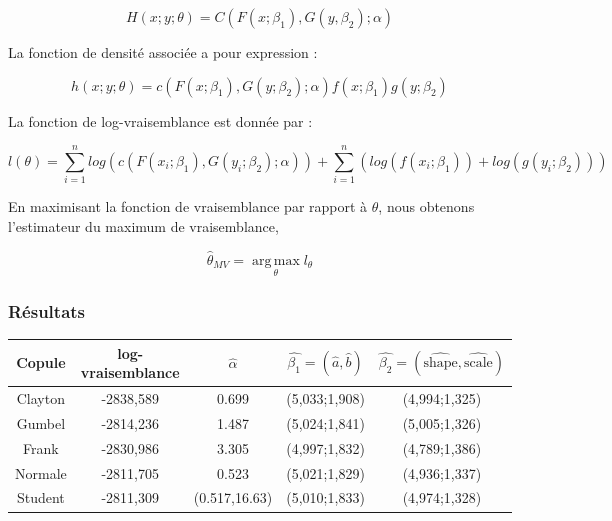 \begin{equation*}
H(x;y;\theta) = C(F(x;\beta_1),G(y,\beta_2);\alpha)
\end{equation*}

\begin{flushleft}
La fonction de densité associée a pour expression :
\end{flushleft}
\begin{equation*}
h(x;y;\theta) = c(F(x;\beta_1),G(y;\beta_2);\alpha)f(x;\beta_1)g(y;\beta_2)
\end{equation*}

\begin{flushleft}
La fonction de log-vraisemblance est donnée par :
\end{flushleft}
\begin{equation*}
l(\theta) = \sum_{i=1}^n log(c(F(x_i;\beta_1),G(y_i;\beta_2);\alpha)) + \sum_{i=1}^n (log(f(x_i;\beta_1)) + log(g(y_i;\beta_2)))
\end{equation*}

En maximisant la fonction de vraisemblance par rapport à $\theta$, nous obtenons l'estimateur du maximum de vraisemblance,

\begin{equation*}
\hat{\theta}_{MV} = \underset{\theta}{\operatorname{arg\,max}}  l_{\theta}
\end{equation*} 

\subsubsection{Résultats}

\begin{center}
\begin{tabular}{|c|c|c|c|c|}
\hline 
Copule & log-vraisemblance & $\hat{\alpha}$ & $\hat{\beta_1} = (\widehat{a},\widehat{b})$ & $\hat{\beta_2} = (\widehat{\text{shape}},\widehat{\text{scale}})$ \\
\hline
Clayton & -2838,589 & 0.699 & (5,033;1,908) & (4,994;1,325) \\
\hline
Gumbel & -2814,236 & 1.487 & (5,024;1,841) & (5,005;1,326) \\
\hline
Frank & -2830,986 & 3.305 & (4,997;1,832) & (4,789;1,386) \\
\hline
Normale & -2811,705 & 0.523 & (5,021;1,829) & (4,936;1,337) \\
\hline
Student & -2811,309 & (0.517,16.63)  & (5,010;1,833) & (4,974;1,328) \\
\hline
\end{tabular}
\end{center}

